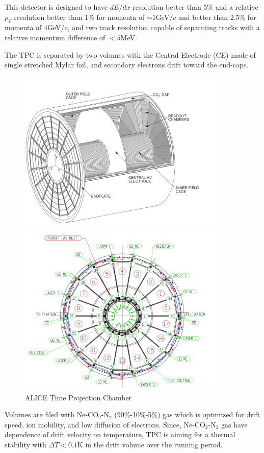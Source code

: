 This detector is designed to have $dE/dx$ resolution better than 5\% and a relative $p_T$ resolution better than 1\% for momenta of $\sim 1$GeV/$c$ and better than 2.5\% for momenta of 4GeV/$c$, and two track resolution capable of separating tracks with a relative momentum difference of $< 5$MeV.

The TPC is separated by two volumes with the Central Electrode (CE) made of single stretched Mylar foil, and secondary electrons drift toward the end-caps. 

\begin{figure}[!p]
\centerline{\includegraphics[width=10.0cm]{figures/tpc1}}
\centerline{\includegraphics[width=10.0cm]{figures/tpc2}}
\caption{ ALICE Time Projection Chamber } 
\label{fig:cmsevt}
\end{figure}


Volumes are filed with Ne-CO$_2$-N$_2$ (90\%-10\%-5\%) gas which is optimized for drift speed, ion mobility, and low diffusion of electrons. Since, Ne-CO$_2$-N$_2$ gas have dependence of drift velocity on temperature, TPC is aiming for a thermal stability with $\Delta T < 0.1$K in the drift volume over the running period. 

